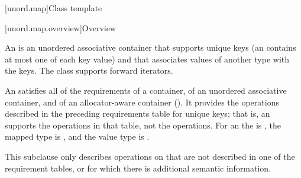 [unord.map]{Class template }%

[unord.map.overview]{Overview}

\pnum
{}%
%
An  is an unordered associative container that
supports unique keys (an  contains at most one of each
key value) and that associates values of another type
 with the keys.
The  class
supports forward iterators.

\pnum
An  satisfies all of the requirements of a container, of an unordered associative container, and of an allocator-aware container (). It provides the operations described in the preceding requirements table for unique keys; that is, an  supports the  operations in that table, not the  operations. For an  the  is , the mapped type is , and the value type is .

\pnum
This subclause only describes operations on  that
are not described in one of the requirement tables, or for which there
is additional semantic information.

